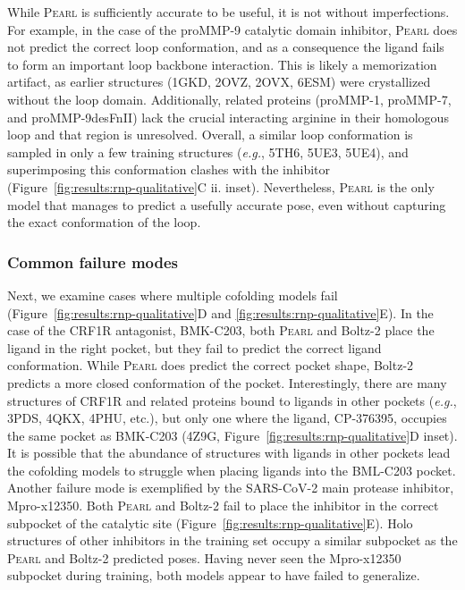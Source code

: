 \documentclass[11pt, letterpaper, onecolumn]{tau-class/tau}
\newcommand{\pearl}{\textsc{Pearl}\xspace}
\newcommand{\boltz}[1]{\mbox{Boltz-#1\xspace}}
\newcommand{\eg}{\textit{e.g.}\xspace}
\begin{document}
While \pearl is sufficiently accurate to be useful, it is not without imperfections.
For example, in the case of the proMMP-9 catalytic domain inhibitor, \pearl does not predict the correct loop conformation, and as a consequence the ligand fails to form an important loop backbone interaction.
This is likely a memorization artifact, as earlier structures (1GKD, 2OVZ, 2OVX, 6ESM) were crystallized without the loop domain.
Additionally, related proteins (proMMP-1, proMMP-7, and proMMP-9desFnII) lack the crucial interacting arginine in their homologous loop and that region is unresolved.
Overall, a similar loop conformation is sampled in only a few training structures (\eg, 5TH6, 5UE3, 5UE4), and superimposing this conformation clashes with the inhibitor (Figure~\ref{fig:results:rnp-qualitative}C ii. inset).
Nevertheless, \pearl is the only model that manages to predict a usefully accurate pose, even without capturing the exact conformation of the loop.

\subsubsection{Common failure modes}\vspace{-0.75ex}
Next, we examine cases where multiple cofolding models fail (Figure~\ref{fig:results:rnp-qualitative}D and \ref{fig:results:rnp-qualitative}E).
In the case of the CRF1R antagonist, BMK-C203, both \pearl and \boltz2 place the ligand in the right pocket, but they fail to predict the correct ligand conformation.
While \pearl does predict the correct pocket shape, \boltz2 predicts a more closed conformation of the pocket.
Interestingly, there are many structures of CRF1R and related proteins bound to ligands in other pockets (\eg, 3PDS, 4QKX, 4PHU, etc.), but only one where the ligand, CP-376395, occupies the same pocket as BMK-C203 (4Z9G, Figure~\ref{fig:results:rnp-qualitative}D inset).
It is possible that the abundance of structures with ligands in other pockets lead the cofolding models to struggle when placing ligands into the BML-C203 pocket. 
Another failure mode is exemplified by the SARS-CoV-2 main protease inhibitor, Mpro-x12350. Both \pearl and \boltz2 fail to place the inhibitor in the correct subpocket of the catalytic site (Figure~\ref{fig:results:rnp-qualitative}E).
Holo structures of other inhibitors in the training set occupy a similar subpocket as the \pearl and \boltz2 predicted poses. Having never seen the Mpro-x12350 subpocket during training, both models appear to have failed to generalize.
\end{document}
